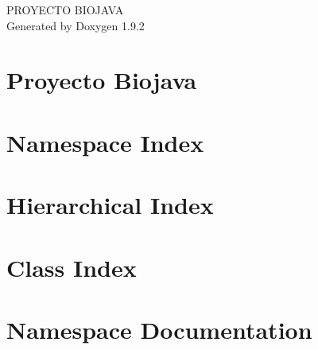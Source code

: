 \documentclass[twoside]{book}
\newcommand{\+}{\discretionary{\mbox{\scriptsize$\hookleftarrow$}}{}{}}
\newcommand{\clearemptydoublepage}{%
    \newpage{\pagestyle{empty}\cleardoublepage}%
  }
\begin{document}
  \raggedbottom
    \hypersetup{pageanchor=false,
                bookmarksnumbered=true,
                pdfencoding=unicode
               }
  \begin{titlepage}
  \vspace*{7cm}
  \begin{center}%
  {\Large PROYECTO BIOJAVA}\\
  \vspace*{1cm}
  {\large Generated by Doxygen 1.9.2}\\
  \end{center}
  \end{titlepage}
  \clearemptydoublepage
  \tableofcontents
  \clearemptydoublepage
  \hypersetup{pageanchor=true}
\chapter{Proyecto Biojava}
\label{md__r_e_a_d_m_e}

\chapter{Namespace Index}

\chapter{Hierarchical Index}

\chapter{Class Index}

\chapter{Namespace Documentation}

\end{document}
